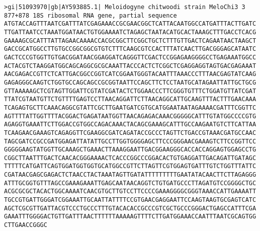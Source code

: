 \documentclass[11pt]{article}
\begin{document}
\begin{Verbatim}[commandchars=\\\{\}]
>gi|51093970|gb|AY593885.1| Meloidogyne chitwoodi strain MeloChi3 3 877+878 18S ribosomal RNA gene, partial sequence
ATGTACCAGTTTAATCGATTTATCGAGAAACCGCGAACGGCTCATTACAATGGCCATGATTTACTTGATC
TTGATTAATCCTAAATGGATAACTGTGGAAAATCTAGAGCTAATACATGCACTAAAGCTTTGACCTCACG
GAAAAGCGCATTTATTAGAACAAAACCACGCGGCTTCGGCTGCTCTTTGTTGACTCAGAATAACTAAGCT
GACCGCATGGCCTTGTGCCGGCGGCGTGTCTTTCAAGCGTCCACTTTATCAACTTGACGGGAGCATAATC
GACTCCCGTGGTTGTGACGGATAACGGAGGATCAGGGTTCGACTCCGGAGAAGGGGCCTGAGAAATGGCC
ACTACGTCTAAGGATGGCAGCAGGCGCGCAAATTACCCACTCTCGGCTCGAGGAGGTAGTGACGAGAAAT
AACGAGACCGTTCTCATTGACGGCCGGTCATCGGAATGGGTACAATTTAAACCCTTTAACGAGTATCAAG
GAGAGGGCAAGTCTGGTGCCAGCAGCCGCGGTAATTCCAGCTTCTCCTAATGCATAGAATTATTGCTGCG
GTTAAAAAGCTCGTAGTTGGATTCGTATCGATACTCTGGAACCCTTCGGGTGTTTCTGGATGTTATCGAT
TTATCGTAATGTTCTGTTTTGAGTCCTTAACAGGATTCTTAACAGGCATTGCAAGTTTACTTTGAACAAA
TCAGAGTGCTTCAAACAGGCGTATTCGCTTGAATGATCGTGCATGGAATAATAGAAAACGATTTCGGTTC
AGTTTTATTGGTTTTACGGACTGAGATAATGGTTAACAGAGACAAACGGGGGCATTTGTATGGCCCCGTG
AGAGGTGAAATTCTTGGACCGTGGCCAGACAAACTACAGCGAAAGCATTTGCCAAGAATGTCTTCATTAA
TCAAGAACGAAAGTCAGAGGTTCGAAGGCGATCAGATACCGCCCTAGTTCTGACCGTAAACGATGCCAAC
TAGCGATCCGCCGATGGAGATTATATTGCCTTGGTGGGGAGCTTCCCGGGAACGAAAGTCTTCCGGTTCC
GGGGGAAGTATGGTTGCAAAGCTGAAACTTAAAGGAATTGACGGAAGGGCACCACCAGGAGTGGAGCCTG
CGGCTTAATTTGACTCAACACGGGAAAACTCACCCGGCCCGGACACTGTGAGGATTGACAGATTGATAGC
TTTTTCATGATTCAGTGGATGGTGGTGCATGGCCGTTCTTAGTTCGTGGAGTGATTTGTCTGGTTTATTC
CGATAACGAGCGAGACTCTAACCTACTAAATAGTTGATATTTTTTTTTGAATATACAACTTCTTAGAGGG
ATTTGCGGTGTTTAGCCGAAAGAAATTGAGCAATAACAGGTCTGTGATGCCCTTAGATGTCCGGGGCTGC
ACGCGCGCTACACTGGCAAAATCAACGTGCTTGTCCTTCCCCGAAAGGGGCGGGTAAACCATTGAAAATT
TGCCGTGATTGGGATCGGAAATTGCAATTATTTTCCGTGAACGAGGAATTCCAAGTAAGTGCGAGTCATC
AGCTCGCGTTGATTACGTCCCTGCCCTTTGTACACACCGCCCGTCGCTGCCCGGGACTGAGCCATTTCGA
GAAATTTGGGGACTGTTGATTTAACTTTTTTAAAAAGTTTTCTTGATGGAAACCAATTTAATCGCAGTGG
CTTGAACCGGGC


\end{Verbatim}
\end{document}
